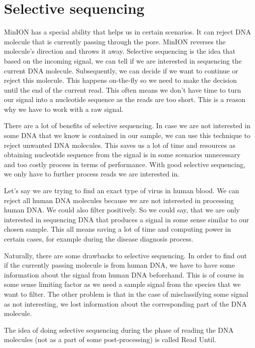 \section{Selective sequencing}

MinION has a special ability that helps us in certain scenarios. It can reject
DNA molecule that is currently passing through the pore. MinION reverses the molecule’s direction and throws it away.
Selective sequencing is the idea that based on the incoming signal, we can tell
if we are interested in sequencing the current DNA molecule. Subsequently, we can decide if we want
to continue or reject this molecule. This happens on-the-fly so we need to make
the decision until the end of the current read. This often means we don't have time to
turn our signal into a nucleotide sequence as the reads are too short. This is
a reason why we have to work with a raw signal.

There are a lot of benefits of selective sequencing. In case we are not interested
in some DNA that we know is contained in our sample, we can use this technique to
reject unwanted DNA molecules. This saves us a lot of time and resources as obtaining
nucleotide sequence from the signal is in some scenarios unnecessary and too
costly process in terms of performance. With good selective sequencing, we only have
to further process reads we are interested in.

Let's say we are trying to find an exact type of virus in human blood. We can
reject all human DNA molecules because we are not interested in processing human
DNA. We could also filter positively. So we could say, that we are only
interested in sequencing DNA that produces a signal in some sense similar to our
chosen sample. This all means saving a lot of time and computing power in certain
cases, for example during the disease diagnosis process.

Naturally, there are some drawbacks to selective sequencing. In order to find out
if the currently passing molecule is from human DNA, we have to have some information
about the signal from human DNA beforehand.
This is of course in some sense limiting factor as we need a sample signal from
the species that we want to filter. The other problem is that in the case of misclassifying
some signal as not interesting, we lost information about the corresponding
part of the DNA molecule.

The idea of doing selective sequencing during the phase of reading the DNA molecules
(not as a part of some post-processing) is called Read Until. 

